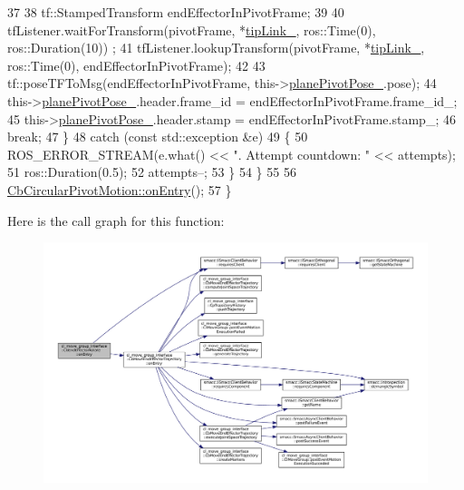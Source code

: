 \begin{DoxyCode}
37 
38                 tf::StampedTransform endEffectorInPivotFrame;
39 
40                 tfListener.waitForTransform(pivotFrame, *\hyperlink{classcl__move__group__interface_1_1CbMoveEndEffectorTrajectory_a24c6c30b9b0761a61fa002d947bd3e11}{tipLink\_}, ros::Time(0), ros::Duration(10))
      ;
41                 tfListener.lookupTransform(pivotFrame, *\hyperlink{classcl__move__group__interface_1_1CbMoveEndEffectorTrajectory_a24c6c30b9b0761a61fa002d947bd3e11}{tipLink\_}, ros::Time(0), 
      endEffectorInPivotFrame);
42 
43                 tf::poseTFToMsg(endEffectorInPivotFrame, this->\hyperlink{classcl__move__group__interface_1_1CbCircularPivotMotion_a0994efbe93b9f9a61fcf3703c360cda2}{planePivotPose\_}.pose);
44                 this->\hyperlink{classcl__move__group__interface_1_1CbCircularPivotMotion_a0994efbe93b9f9a61fcf3703c360cda2}{planePivotPose\_}.header.frame\_id = endEffectorInPivotFrame.frame\_id\_;
45                 this->\hyperlink{classcl__move__group__interface_1_1CbCircularPivotMotion_a0994efbe93b9f9a61fcf3703c360cda2}{planePivotPose\_}.header.stamp = endEffectorInPivotFrame.stamp\_;
46                 \textcolor{keywordflow}{break};
47             \}
48             \textcolor{keywordflow}{catch} (\textcolor{keyword}{const} std::exception &e)
49             \{
50                 ROS\_ERROR\_STREAM(e.what() << \textcolor{stringliteral}{". Attempt countdown: "} << attempts);
51                 ros::Duration(0.5);
52                 attempts--;
53             \}
54         \}
55 
56         \hyperlink{classcl__move__group__interface_1_1CbMoveEndEffectorTrajectory_aaedd074fd178c6390a4a3f1ccff23ad3}{CbCircularPivotMotion::onEntry}();
57     \}
\end{DoxyCode}
Here is the call graph for this function\+:
\nopagebreak
\begin{figure}[H]
\begin{center}
\leavevmode
\includegraphics[width=350pt]{classcl__move__group__interface_1_1CbEndEffectorRotate_a3e60bfba48906696587d66af89f7ee2b_cgraph}
\end{center}
\end{figure}


